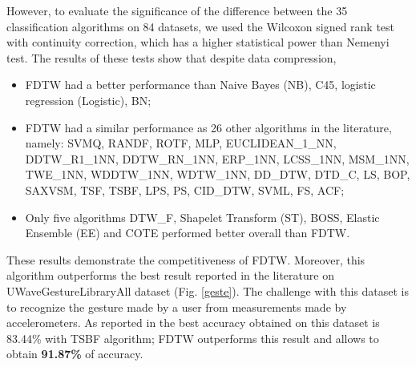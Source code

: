 However, to evaluate the significance of the difference between the 35 classification algorithms on 84 datasets, we used the Wilcoxon signed rank test with continuity correction, which has a higher statistical power than Nemenyi test. The results of these tests  show that despite data compression, 
\begin{itemize}
  \item  FDTW had a better performance than Naive Bayes (NB), C45,  logistic regression (Logistic), BN;
  \item FDTW had a similar performance as 26 other algorithms in the literature, namely: SVMQ, RANDF, ROTF, MLP, EUCLIDEAN\_1\_NN, DDTW\_R1\_1NN, DDTW\_RN\_1NN, ERP\_1NN, LCSS\_1NN, MSM\_1NN, TWE\_1NN, WDDTW\_1NN, WDTW\_1NN, DD\_DTW, DTD\_C, LS, BOP, SAXVSM, TSF, TSBF, LPS, PS, CID\_DTW, SVML, FS, ACF;
  \item Only five algorithms DTW\_F, Shapelet Transform (ST), BOSS, Elastic Ensemble (EE) and COTE performed better overall than FDTW.
\end{itemize}

These results demonstrate the competitiveness of FDTW. Moreover, this algorithm
outperforms the best result reported in the literature on  UWaveGestureLibraryAll dataset (Fig.
\ref{geste}).
The challenge with this dataset is to recognize the gesture made by a user
from measurements made by accelerometers. As reported in \cite{Bagnall} the best accuracy obtained
on this dataset is 83.44\% with TSBF algorithm; FDTW outperforms this result and allows to obtain \textbf{91.87\%} of accuracy.


